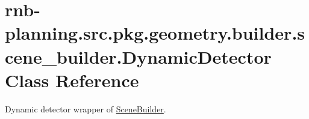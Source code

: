 \hypertarget{classrnb-planning_1_1src_1_1pkg_1_1geometry_1_1builder_1_1scene__builder_1_1_dynamic_detector}{}\section{rnb-\/planning.src.\+pkg.\+geometry.\+builder.\+scene\+\_\+builder.\+Dynamic\+Detector Class Reference}
\label{classrnb-planning_1_1src_1_1pkg_1_1geometry_1_1builder_1_1scene__builder_1_1_dynamic_detector}


Dynamic detector wrapper of \hyperlink{classrnb-planning_1_1src_1_1pkg_1_1geometry_1_1builder_1_1scene__builder_1_1_scene_builder}{Scene\+Builder}.  



